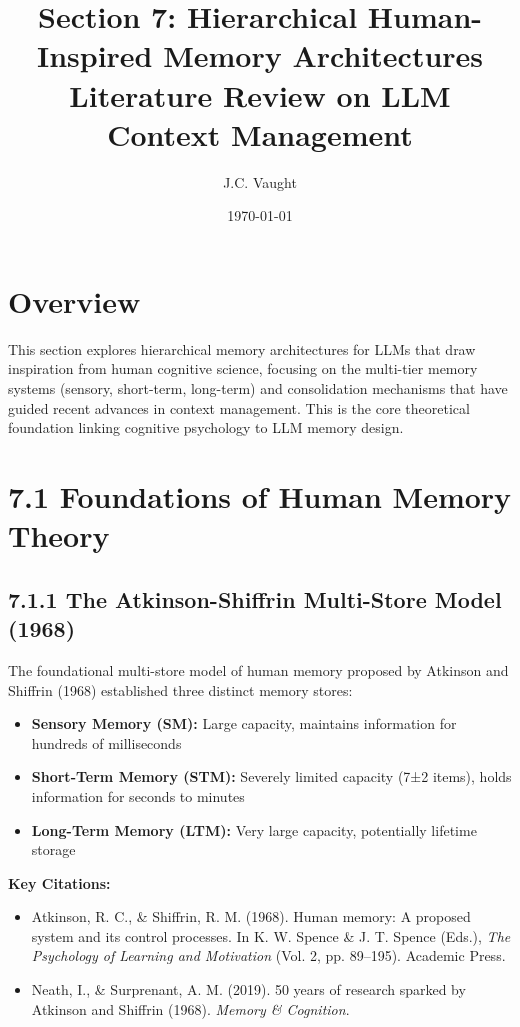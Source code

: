 \documentclass[11pt,letterpaper]{article}
\title{\textbf{\color{garnet}Section 7: Hierarchical Human-Inspired Memory Architectures\\
\large{Literature Review on LLM Context Management}}}
\author{J.C. Vaught}
\date{\today}
\begin{document}
\maketitle

\section*{\color{garnet}Overview}

This section explores hierarchical memory architectures for LLMs that draw inspiration from human cognitive science, focusing on the multi-tier memory systems (sensory, short-term, long-term) and consolidation mechanisms that have guided recent advances in context management. This is the core theoretical foundation linking cognitive psychology to LLM memory design.

\section{\color{garnet}7.1 Foundations of Human Memory Theory}

\subsection{7.1.1 The Atkinson-Shiffrin Multi-Store Model (1968)}

The foundational multi-store model of human memory proposed by Atkinson and Shiffrin (1968) established three distinct memory stores:

\begin{itemize}[leftmargin=*]
    \item \textbf{Sensory Memory (SM):} Large capacity, maintains information for hundreds of milliseconds
    \item \textbf{Short-Term Memory (STM):} Severely limited capacity (7±2 items), holds information for seconds to minutes
    \item \textbf{Long-Term Memory (LTM):} Very large capacity, potentially lifetime storage
\end{itemize}

\textbf{Key Citations:}
\begin{itemize}[leftmargin=*]
    \item Atkinson, R. C., \& Shiffrin, R. M. (1968). Human memory: A proposed system and its control processes. In K. W. Spence \& J. T. Spence (Eds.), \textit{The Psychology of Learning and Motivation} (Vol. 2, pp. 89--195). Academic Press.
    \item Neath, I., \& Surprenant, A. M. (2019). 50 years of research sparked by Atkinson and Shiffrin (1968). \textit{Memory \& Cognition}.
\end{itemize}
\end{document}
